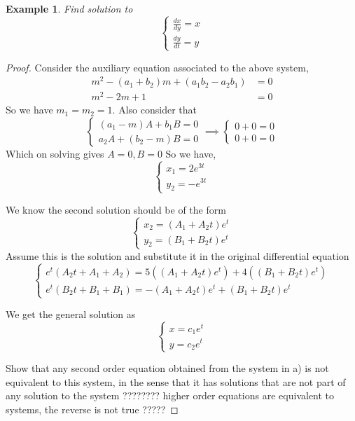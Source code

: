 \documentclass[oneside,11pt,pdftex,final]{book}%
\numberwithin{equation}{section}
\newtheorem{example}[theorem]{Example}
\numberwithin{section}{chapter}
\numberwithin{equation}{chapter}
\begin{document}
\begin{example}
	Find solution to \[
	\begin{cases}
		\frac{dx}{dy}=x\\
		\frac{dy}{dt}=y
	\end{cases}  \]
\end{example}
\begin{proof}
	Consider the auxiliary equation associated to the above system,
	\begin{align*}
		m^2-(a_1+b_2)m+(a_1b_2-a_2b_1)&=0\\
		m^2-2m+1&=0
	\end{align*}
	So we have $ m_1=m_2=1 $.
Also consider that
\[ \begin{cases}
	(a_1-m)A+b_1B=0\\
	a_2A+(b_2-m)B=0
\end{cases} \implies 
\begin{cases}
	0+0=0\\
	0+0=0
\end{cases}\]
Which on solving gives $ A=0,B=0 $
So we have,
\[ \begin{cases}
	x_1=2e^{3t}\\
	y_2=-e^{3t}
\end{cases} \]

We know the second solution should be of the form
\[ \begin{cases}
	x_2=(A_1+A_2t)e^{t}\\
	y_2=(B_1+B_2t)e^{t}
\end{cases} \]
Assume this is the solution and substitute it in the original differential equation
\[ \begin{cases}
	e^t (A_2 t + A_1 + A_2)=5((A_1+A_2t)e^{t})+4((B_1+B_2t)e^{t})\\
	e^t(B_2t+B_1+B_1)=-(A_1+A_2t)e^{t}+(B_1+B_2t)e^{t}
\end{cases} \]

We get the general solution as 
\[ \begin{cases}
	x=c_1e^t\\
	y=c_2e^t 
\end{cases} \]

Show that any second order equation obtained from the system in a) is not equivalent to this system, in the sense that it has solutions that are not part of any solution to the system ????????
higher order equations are equivalent to systems, the reverse is not true ?????
\end{proof}
\end{document}
